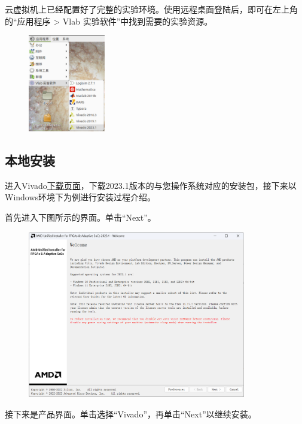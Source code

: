\documentclass{ctexart}
\begin{document}
云虚拟机上已经配置好了完整的实验环境。使用远程桌面登陆后，即可在左上角的“应用程序 > Vlab 实验软件”中找到需要的实验资源。

\begin{figure}[H]
    \centering
    \includegraphics[width=0.3\textwidth]{lab0/3.png}
\end{figure}

\subsection{本地安装}

进入Vivado\href{https://china.xilinx.com/support/download/index.html/content/xilinx/zh/downloadNav/vivado-design-tools/2023-1.html}{下载页面}，下载2023.1版本的与您操作系统对应的安装包，接下来以Windows环境下为例进行安装过程介绍。

首先进入下图所示的界面。单击“Next”。

\begin{figure}[H]
    \centering
    \includegraphics[width=0.85\textwidth]{lab0/4.png}
\end{figure}

接下来是产品界面。单击选择“Vivado”，再单击“Next”以继续安装。
\end{document}
